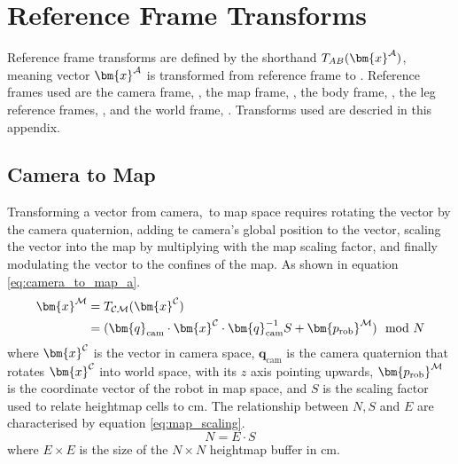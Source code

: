 \chapter{Reference Frame Transforms} \label{app:transforms}
    Reference frame transforms are defined by the shorthand \(\transframe{\bm{x}\inrefframe{A}}{A}{B}\), meaning vector \(\bm{x}\inrefframe{A}\) is transformed
    from reference frame  to . Reference frames used are the camera frame, ,
    the map frame, , the body frame, , the leg reference frames, , and the world frame, . Transforms used are
    descried in this appendix.

    \section{Camera to Map}
        Transforming a vector from camera,\ to map space requires rotating the vector by the camera quaternion, adding
        te camera's global position to the vector, scaling the vector into the map by multiplying with the map scaling
        factor, and finally modulating the vector to the confines of the map. As shown in equation \ref{eq:camera_to_map_a}.
        \begin{align} \label{eq:camera_to_map_a}
        \begin{split}
            \bm{x}\inrefframe{\fmap} &= \transframe{\bm{x}\inrefframe{\fcamera}}{\fcamera}{\fmap}\\ 
            &= (\bm{q}_\text{cam} \cdot \bm{x}\inrefframe{\fcamera} \cdot \bm{q}_\text{cam}^{-1}S + \bm{p_\text{rob}}\inrefframe{\fmap}) \mod N
        \end{split}
        \end{align}
        where \(\bm{x}\inrefframe{\fcamera}\) is the vector in camera space, \(\bm{q}_\text{cam}\) is the camera quaternion that rotates \(\bm{x}\inrefframe{\fcamera}\) 
        into world space, with its \(z\) axis pointing upwards, \(\bm{p_\text{rob}}\inrefframe{\fmap}\) is the coordinate vector of the robot in map space, and \(S\) is the scaling factor
        used to relate heightmap cells to cm. The relationship between \(N, S\) and \(E\) are characterised by equation \ref{eq:map_scaling}.
        \begin{equation} \label{eq:map_scaling}
            N = E \cdot S
        \end{equation}
        where \(E\times E\) is the size of the \(N\times N\) heightmap buffer in cm.
    
